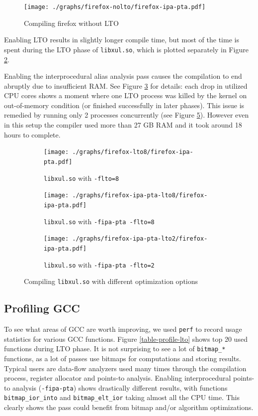 \begin{figure}[!ht]
	\centering
	\texttt{[image: ./graphs/firefox-nolto/firefox-ipa-pta.pdf]}
	\caption{Compiling firefox without LTO}
	\label{figure-firefox-nolto}
\end{figure}

Enabling LTO results in slightly longer compile time, but most of the time is
spent during the LTO phase of {\tt libxul.so}, which is plotted separately in Figure
\ref{figure-firefox-lto8}.

Enabling the interprocedural alias analysis pass causes the compilation to end
abruptly due to insufficient RAM.  See Figure \ref{figure-firefox-ipa-pta-lto8}
for details: each drop in utilized CPU cores shows a moment where one LTO
process was killed by the kernel on out-of-memory condition (or finished successfully in
later phases). This issue is remedied by running only 2 processes concurrently
(see Figure \ref{figure-firefox-ipa-pta-lto2}).  However even in this setup the
compiler used more than 27 GB RAM and it took around 18 hours to complete.

\begin{figure}
\begin{subfigure}[b]{\textwidth}
	\centering
	\texttt{[image: ./graphs/firefox-lto8/firefox-ipa-pta.pdf]}
	\caption{{\tt libxul.so} with {\tt -flto=8}}
	\label{figure-firefox-lto8}
\end{subfigure}
\begin{subfigure}[b]{\textwidth}
	\centering
	\texttt{[image: ./graphs/firefox-ipa-pta-lto8/firefox-ipa-pta.pdf]}
	\caption{{\tt libxul.so} with {\tt -fipa-pta -flto=8}}
	\label{figure-firefox-ipa-pta-lto8}
\end{subfigure}
\begin{subfigure}[b]{\textwidth}
	\centering
	\texttt{[image: ./graphs/firefox-ipa-pta-lto2/firefox-ipa-pta.pdf]}
	\caption{{\tt libxul.so} with {\tt -fipa-pta -flto=2}}
	\label{figure-firefox-ipa-pta-lto2}
\end{subfigure}
\caption{Compiling {\tt libxul.so} with different optimization options}
\end{figure}

\subsection{Profiling GCC}

To see what areas of GCC are worth improving, we used {\tt perf}  to record usage
statistics for various GCC functions. Figure \ref{table-profile-lto} shows top 20 used
functions during LTO phase. It is not surprising to see a lot of {\tt bitmap\_*}
functions, as a lot of passes use bitmaps for computations and storing results.
Typical users are data-flow analyzers \cite{muchnick1997advanced} used many times through the
compilation process, register allocator and points-to analysis. Enabling
interprocedural points-to analysis ({\tt -fipa-pta}) shows drastically different
results, with functions {\tt bitmap\_ior\_into} and {\tt bitmap\_elt\_ior}
taking almost all the CPU time. This clearly shows the pass could benefit from
bitmap and/or algorithm optimizations.

